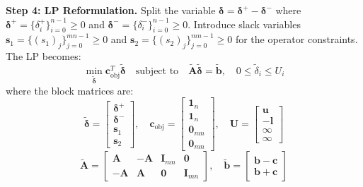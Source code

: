\documentclass{article}
\begin{document}
\textbf{Step 4: LP Reformulation.} Split the variable $\boldsymbol{\delta} = \boldsymbol{\delta}^+ - \boldsymbol{\delta}^-$ where $\boldsymbol{\delta}^+ = \{\delta^+_i\}_{i=0}^{n-1} \ge 0$ and $\boldsymbol{\delta}^- = \{\delta^-_i\}_{i=0}^{n-1} \ge 0$. Introduce slack variables $\mathbf{s}_1 = \{(s_1)_j\}_{j=0}^{mn-1} \ge 0$ and $\mathbf{s}_2 = \{(s_2)_j\}_{j=0}^{mn-1} \ge 0$ for the operator constraints. The LP becomes:
\begin{equation}
    \min_{\tilde{\boldsymbol{\delta}}} \mathbf{c}_{\text{obj}}^T \tilde{\boldsymbol{\delta}} \quad \text{subject to} \quad \tilde{\mathbf{A}}\tilde{\boldsymbol{\delta}} = \tilde{\mathbf{b}}, \quad 0 \le \tilde{\delta}_i \le U_i
\end{equation}
where the block matrices are:
\begin{equation}
    \tilde{\boldsymbol{\delta}} = \begin{bmatrix} \boldsymbol{\delta}^+ \\ \boldsymbol{\delta}^- \\ \mathbf{s}_1 \\ \mathbf{s}_2 \end{bmatrix}, \quad
    \mathbf{c}_{\text{obj}} = \begin{bmatrix} \mathbf{1}_n \\ \mathbf{1}_n \\ \mathbf{0}_{mn} \\ \mathbf{0}_{mn} \end{bmatrix}, \quad
    \mathbf{U} = \begin{bmatrix} \mathbf{u} \\ -\mathbf{l} \\ \infty \\ \infty \end{bmatrix}
\end{equation}
\begin{equation}
    \tilde{\mathbf{A}} = \begin{bmatrix} \mathbf{A} & -\mathbf{A} & \mathbf{I}_{mn} & \mathbf{0} \\ -\mathbf{A} & \mathbf{A} & \mathbf{0} & \mathbf{I}_{mn} \end{bmatrix}, \quad
    \tilde{\mathbf{b}} = \begin{bmatrix} \mathbf{b} - \mathbf{c} \\ \mathbf{b} + \mathbf{c} \end{bmatrix}
\end{equation}
\end{document}
